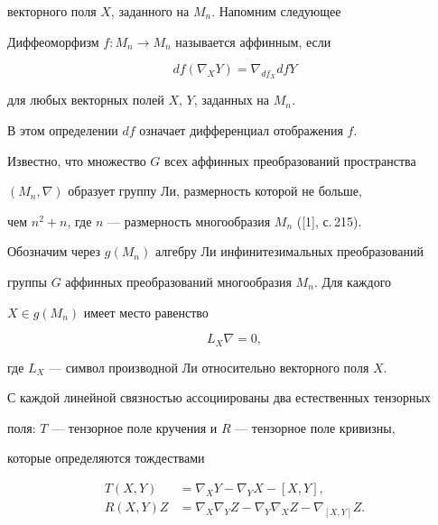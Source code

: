 векторного поля $X$, заданного на $M_n$. Напомним следующее 


 


\begin{defns} 


Диффеоморфизм $f:M_n\to M_n$ называется аффинным, если 


$$ 


df(\nabla_X Y)=\nabla_{df_X}df Y 


$$ 


для любых векторных полей $X$, $Y$, заданных на $M_n$.  


\end{defns} 


 


В этом определении $df$ означает дифференциал отображения $f$. 


 


Известно, что множество $G$ всех аффинных преобразований пространства 


$(M_n,\nabla)$ образует группу Ли, размерность которой не больше, 


чем $n^2+n$, где $n$ --- размерность многообразия $M_n$ ([1], с.\,215). 


 


Обозначим через $g(M_n)$ алгебру Ли инфинитезимальных преобразований  


группы $G$ аффинных преобразований многообразия $M_n$. Для каждого  


$X\in g(M_n)$ имеет место равенство 


$$ 


L_X\nabla=0, 


$$ 


где $L_X$ --- символ производной Ли относительно векторного поля $X$. 


 


С каждой линейной связностью ассоциированы два естественных тензорных  


поля: $T$ --- тензорное поле кручения и $R$ --- тензорное поле кривизны,  


которые определяются тождествами 


\begin{align*} 


T(X,Y)&=\nabla_X Y-\nabla_Y X-[X,Y], \\ 


R(X,Y)Z&=\nabla_X \nabla_Y Z-\nabla_Y \nabla_X Z- 


\nabla_{[X,Y]}Z. 


\end{align*} 



